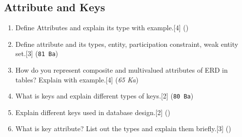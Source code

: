 \documentclass[12pt]{article}
\begin{document}
    \subsection{Attribute and Keys}
    \begin{enumerate}
    \item Define Attributes and explain its type with example.\hfill[4] ()

    \item Define attribute and its types, entity, participation constraint, weak entity set.\hfill [3] (\texttt{81 Ba})

    \item How do you represent composite and multivalued attributes of ERD in tables? Explain with example.\hfill[4] (\textit{65 Ka})

    \item What is keys and explain different types of keys.\hfill[2] (\texttt{80 Ba})

    \item Explain different keys used in database design.\hfill[2] ()

    \item What is key attribute? List out the types and explain them briefly.\hfill[3] ()
    \end{enumerate}
\end{document}
